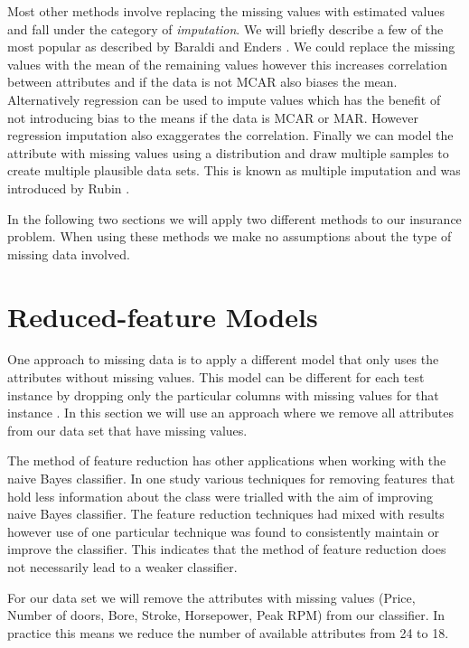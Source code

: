 Most other methods involve replacing the missing values with estimated values and fall under the category of \textit{imputation}.
We will briefly describe a few of the most popular as described by Baraldi and Enders \cite{Baraldi09}.
We could replace the missing values with the mean of the remaining values however this increases correlation between attributes and if the data is not MCAR also biases the mean.
Alternatively regression can be used to impute values which has the benefit of not introducing bias to the means if the data is MCAR or MAR.
However regression imputation also exaggerates the correlation.
Finally we can model the attribute with missing values using a distribution and draw multiple samples to create multiple plausible data sets.
This is known as multiple imputation and was introduced by Rubin \cite{Rubin87}.

In the following two sections we will apply two different methods to our insurance problem.
When using these methods we make no assumptions about the type of missing data involved.

\section{Reduced-feature Models}

One approach to missing data is to apply a different model that only uses the attributes without missing values. This model can be different for each test instance by dropping only the particular columns with missing values for that instance \cite{Saar-Tsechansky07}.
In this section we will use an approach where we remove all attributes from our data set that have missing values.

The method of feature reduction has other applications when working with the naive Bayes classifier.
In one study \cite{Novakovic10} various techniques for removing features that hold less information about the class were trialled with the aim of improving naive Bayes classifier.
The feature reduction techniques had mixed with results however use of one particular technique was found to consistently maintain or improve the classifier.
This indicates that the method of feature reduction does not necessarily lead to a weaker classifier.

For our data set we will remove the attributes with missing values (Price, Number of doors, Bore, Stroke, Horsepower, Peak RPM) from our classifier.
In practice this means we reduce the number of available attributes from 24 to 18.

